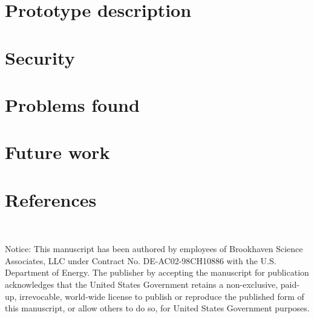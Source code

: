 \documentclass[a4paper]{jpconf}
\begin{document}
\section{Prototype description}

\section{Security}

\section{Problems found}

\section{Future work}




\section*{References}{}




~

Notice:
This manuscript has been authored by employees of Brookhaven Science Associates,
LLC under Contract No. DE-AC02-98CH10886 with the U.S. Department of Energy.
The publisher by accepting the manuscript for publication acknowledges
that the United States Government retains a non-exclusive, paid-up, irrevocable,
world-wide license to publish or reproduce the published form of this manuscript,
or allow others to do so, for United States Government purposes.
\end{document}
